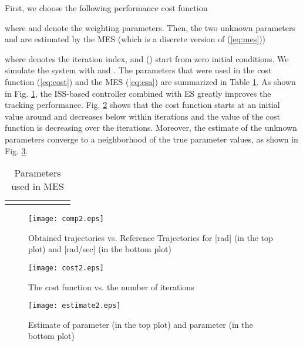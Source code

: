 \documentclass[twoside,leqno,onecolumn]{article}
\begin{document}
First, we choose the following performance cost function

where  and  denote the weighting parameters. Then,
the two unknown parameters  and  are estimated
by the MES (which is a discrete version of (\ref{eq:mes}))

where  denotes the iteration index,  and
 () start from zero initial
conditions. We simulate the system with  and
. The parameters that were used in the cost
function (\ref{eq:cost}) and the MES (\ref{eq:esa}) are summarized
in Table \ref{tab:case2}.
As shown in Fig. \ref{fig:comp_case2}, the ISS-based controller
combined with ES greatly improves the tracking performance. Fig.
\ref{fig:cost_case2} shows that the cost function starts at an
initial value around  and decreases below  within 
iterations and the value of the cost function is decreasing over
the iterations. Moreover, the estimate of the unknown parameters
converge to a neighborhood of the true parameter values, as shown
in Fig. \ref{fig:estimate_case2}.

\begin{table}
\caption{Parameters used in MES} \label{tab:case2} \centering
\begin{tabular}{ |c|c|c|c|c|c|c| }
 \hline
 &  &  & &  &&  \\ [0.5ex]
\hline
 &  &  &  &  &  &   \\
 \hline
\end{tabular}
\end{table}
\begin{figure}
\vspace{-0cm}
\begin{center}
 \texttt{[image: comp2.eps]}
 \vspace{-0cm}
 \caption{Obtained trajectories vs. Reference Trajectories for  [rad] (in the top plot) and  [rad/sec] (in the bottom plot)}
 \end{center}
 \label{fig:comp_case2}
\end{figure}
\begin{figure}
 \centering
 \vspace{-0cm}
 \hspace{-0cm}\texttt{[image: cost2.eps]}
 \vspace{-0cm}
 \caption{The cost function vs. the number of iterations}
 \label{fig:cost_case2}
\end{figure}
\begin{figure}
 \centering
 \vspace{-0cm}
 \texttt{[image: estimate2.eps]}
 \vspace{-0cm}
 \caption{Estimate of parameter  (in the top plot) and parameter  (in the bottom plot)}
 \label{fig:estimate_case2}
\end{figure}
\end{document}
